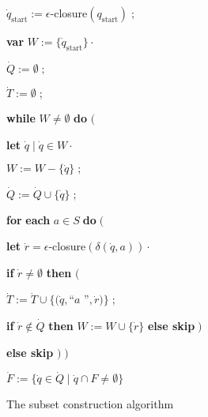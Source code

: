 \begin{algorithm}\begin{singlespaced}%

\begin{code}
$\dot{q}_{\mathrm{start}}:=\epsilon$-closure$(q_{\mathrm{start}})\;;$

\textbf{var} $W:=\{\dot{q}_{\mathrm{start}}\}\cdot$

$\dot{Q}:=\emptyset\;;$

$\dot{T}:=\emptyset\;;$

\textbf{while} $W\neq\emptyset$ \textbf{do }$\mathbf{(}$

\begin{indent}
\item \textbf{let} $\dot{q}\mid\dot{q}\in W\cdot$

\item $W:=W-\{\dot{q}\}\;;$

\item $\dot{Q}:=\dot{Q}\cup\{\dot{q}\}\;;$

\item \textbf{for} \textbf{each} $a\in S\;$\textbf{do}$\;($

\begin{indent}
\item \textbf{let} $\dot{r}=\epsilon$-closure$(\delta(\dot{q},a))\cdot$

\item \textbf{if} $\dot{r}\neq\emptyset$ \textbf{then }$($

\begin{indent}
\item $\dot{T}:=\dot{T}\cup\{(\dot{q},$\textsf{\textquotedblleft}$a$\textsf{%
\textquotedblright}$,\dot{r})\}\;;$

\item \textbf{if} $\dot{r}\not \in \dot{Q}$ \textbf{then} $W:=W\cup\{\dot {r}%
\}$ \textbf{else skip}$\;)$
\end{indent}

\item \textbf{else skip} $)\;)$
\end{indent}
\end{indent}

$\dot{F}:=\{\dot{q}\in\dot{Q}\mid\dot{q}\cap F\neq\emptyset\}$
\end{code}

\caption{The subset construction algorithm}%
\label{alg:subsetcons}%
\end{singlespaced}\end{algorithm}%

